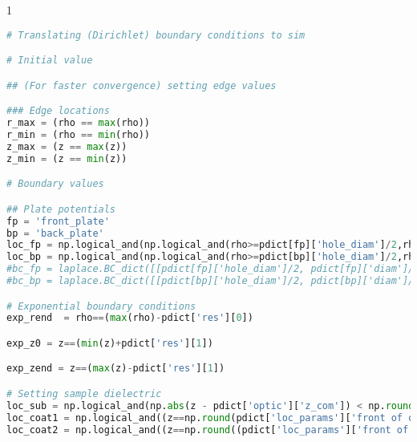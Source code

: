 \begin{spacing}{1} \begin{lstlisting}[frame=single, language=Python]
# Translating (Dirichlet) boundary conditions to sim 

# Initial value 

## (For faster convergence) setting edge values

### Edge locations
r_max = (rho == max(rho))
r_min = (rho == min(rho))
z_max = (z == max(z))
z_min = (z == min(z))

# Boundary values 

## Plate potentials
fp = 'front_plate'
bp = 'back_plate'
loc_fp = np.logical_and(np.logical_and(rho>=pdict[fp]['hole_diam']/2,rho<=pdict[fp]['diam']/2),z == pdict[fp]['zpos'])
loc_bp = np.logical_and(np.logical_and(rho>=pdict[bp]['hole_diam']/2,rho<=pdict[bp]['diam']/2),z == pdict[bp]['zpos'])
#bc_fp = laplace.BC_dict([[pdict[fp]['hole_diam']/2, pdict[fp]['diam']/2], pdict[fp]['zpos']],pdict[fp]['voltage'],fp, LAMBD)
#bc_bp = laplace.BC_dict([[pdict[bp]['hole_diam']/2, pdict[bp]['diam']/2], pdict[bp]['zpos']],pdict[fp]['voltage'],bp, LAMBD)

# Exponential boundary conditions
exp_rend  = rho==(max(rho)-pdict['res'][0])

exp_z0 = z==(min(z)+pdict['res'][1])

exp_zend = z==(max(z)-pdict['res'][1])

# Setting sample dielectric
loc_sub = np.logical_and(np.abs(z - pdict['optic']['z_com']) < np.round((pdict['optic']['thickness']/2),pdict['res_exp'][1]), (rho<np.round((pdict['optic']['diam']/2),pdict['res_exp'][0])))
loc_coat1 = np.logical_and((z==np.round(pdict['loc_params']['front of optic']['z'],pdict['res_exp'][1])), (rho < np.round((pdict['optic']['diam']/2), pdict['res_exp'][0])))
loc_coat2 = np.logical_and((z==np.round((pdict['loc_params']['front of optic']['z']-pdict['res'][1]),pdict['res_exp'][1])), (rho < (np.round(pdict['optic']['diam']/2, pdict['res_exp'][0]))))
\end{lstlisting} \end{spacing}

